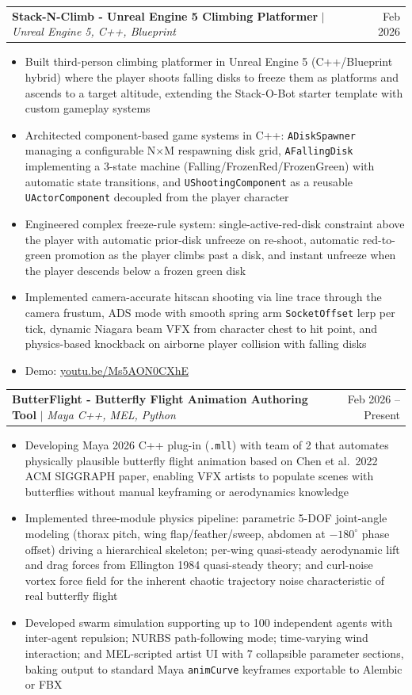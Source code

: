 \documentclass[letterpaper,11pt]{article}
\makeatletter
\newcommand{\resumeItem}[1]{
  \item\small{
    {#1 \vspace{-3pt}}
  }
}
\newcommand{\resumeProjectHeading}[2]{
    \item
    \begin{tabular*}{0.97\textwidth}{l@{\extracolsep{\fill}}r}
      \small#1 & #2 \\
    \end{tabular*}\vspace{-7pt}
}
\newcommand{\resumeItemListStart}{\begin{itemize}}
\newcommand{\resumeItemListEnd}{\end{itemize}\vspace{-5pt}}
\makeatother
\begin{document}
    \resumeProjectHeading
          {\textbf{Stack-N-Climb - Unreal Engine 5 Climbing Platformer} $|$ \emph{Unreal Engine 5, C++, Blueprint}}{Feb 2026}
          \resumeItemListStart
          \resumeItem{Built third-person climbing platformer in Unreal Engine 5 (C++/Blueprint hybrid) where the player shoots falling disks to freeze them as platforms and ascends to a target altitude, extending the Stack-O-Bot starter template with custom gameplay systems}
          \resumeItem{Architected component-based game systems in C++: \texttt{ADiskSpawner} managing a configurable N×M respawning disk grid, \texttt{AFallingDisk} implementing a 3-state machine (Falling/FrozenRed/FrozenGreen) with automatic state transitions, and \texttt{UShootingComponent} as a reusable \texttt{UActorComponent} decoupled from the player character}
          \resumeItem{Engineered complex freeze-rule system: single-active-red-disk constraint above the player with automatic prior-disk unfreeze on re-shoot, automatic red-to-green promotion as the player climbs past a disk, and instant unfreeze when the player descends below a frozen green disk}
          \resumeItem{Implemented camera-accurate hitscan shooting via line trace through the camera frustum, ADS mode with smooth spring arm \texttt{SocketOffset} lerp per tick, dynamic Niagara beam VFX from character chest to hit point, and physics-based knockback on airborne player collision with falling disks}
          \resumeItem{Demo: \href{https://youtu.be/Ms5AON0CXhE}{\underline{youtu.be/Ms5AON0CXhE}}}
          \resumeItemListEnd

    \resumeProjectHeading
          {\textbf{ButterFlight - Butterfly Flight Animation Authoring Tool} $|$ \emph{Maya C++, MEL, Python}}{Feb 2026 -- Present}
          \resumeItemListStart
          \resumeItem{Developing Maya 2026 C++ plug-in (\texttt{.mll}) with team of 2 that automates physically plausible butterfly flight animation based on Chen et al.\ 2022 ACM SIGGRAPH paper, enabling VFX artists to populate scenes with butterflies without manual keyframing or aerodynamics knowledge}
          \resumeItem{Implemented three-module physics pipeline: parametric 5-DOF joint-angle modeling (thorax pitch, wing flap/feather/sweep, abdomen at $-180^\circ$ phase offset) driving a hierarchical skeleton; per-wing quasi-steady aerodynamic lift and drag forces from Ellington 1984 quasi-steady theory; and curl-noise vortex force field for the inherent chaotic trajectory noise characteristic of real butterfly flight}
          \resumeItem{Developed swarm simulation supporting up to 100 independent agents with inter-agent repulsion; NURBS path-following mode; time-varying wind interaction; and MEL-scripted artist UI with 7 collapsible parameter sections, baking output to standard Maya \texttt{animCurve} keyframes exportable to Alembic or FBX}
          \resumeItemListEnd
\end{document}
